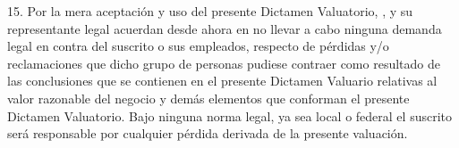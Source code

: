 \begin{enumerate}
\begin{enumerate}
\begin{enumerate}
15.	Por la mera aceptación y uso del presente Dictamen Valuatorio, \textcolor{principal}{\empresaSolicitante}, y su representante legal acuerdan desde ahora en no llevar a cabo ninguna demanda legal en contra del suscrito o sus empleados, respecto de p\'erdidas y/o reclamaciones que dicho grupo de personas pudiese contraer como resultado de las conclusiones que se contienen en el presente Dictamen Valuario relativas al valor razonable del negocio y dem\'as elementos que conforman el presente Dictamen Valuatorio. Bajo ninguna norma legal, ya sea local o federal el suscrito ser\'a responsable por cualquier p\'erdida derivada de la presente valuaci\'on.

		
	\end{enumerate}	
	
	\end{enumerate}










\end{enumerate}